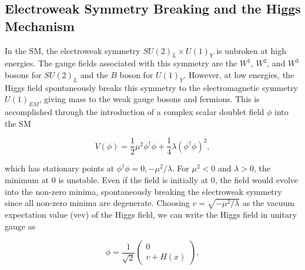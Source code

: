 \subsection{Electroweak Symmetry Breaking and the Higgs Mechanism}\label{sec:ewsb}

In the SM, the electroweak symmetry $SU(2)_L \times U(1)_Y$ is unbroken at high energies.
The gauge fields associated with this symmetry are the $W^1$, $W^2$, and $W^3$ bosons for $SU(2)_L$ and the $B$ boson for $U(1)_Y$.
However, at low energies, the Higgs field spontaneously breaks this symmetry to the electromagnetic symmetry $U(1)_{EM}$, giving mass to the weak gauge bosons and fermions.
This is accomplished through the introduction of a complex scalar doublet field $\phi$ into the SM

\begin{equation}
    V(\phi) = \frac{1}{2}\mu^2 \phi^\dagger \phi + \frac{1}{4}\lambda (\phi^\dagger \phi)^2,
    \label{higgs_potential}
\end{equation}

which has stationary points at $\phi^\dagger \phi = 0, -\mu^2/\lambda$.
For $\mu^2 < 0$ and $\lambda > 0$, the minimum at 0 is unstable.
Even if the field is initially at 0, the field would evolve into the non-zero minima, spontaneously breaking the electroweak symmetry since all non-zero minima are degenerate.
Choosing $v = \sqrt{-\mu^2/\lambda}$ as the vacuum expectation value (vev) of the Higgs field, we can write the Higgs field in unitary gauge as

\begin{equation}
    \phi = \frac{1}{\sqrt{2}} \begin{pmatrix} 0 \\ v + H(x) \end{pmatrix},
    \label{higgs_field}
\end{equation}

